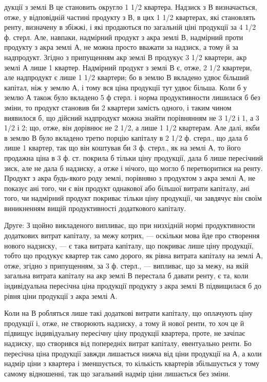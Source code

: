 дукції з землі В це становить округло 1 1/2 квартера. Надзиск з В визначається,
отже, у відповідній частині продукту з В, в цих 1 1/2 квартерах, які
становлять ренту, визначену в збіжжі, і які продаються по загальній ціні продукції
за 4  1/2 ф. стерл. Але, навпаки, надмірний продукт з акра землі В, надмірний
проти продукту з акра землі А, не можна просто вважати за надзиск,
а тому й за надпродукт. Згідно з припущенням акр землі В продукує 3  1/2 квартери,
акр землі А лише 1 квартер. Надмірний продукт з землі В є, отже,
2 1/2 квартери, але надпродукт є лише 1 1/2 квартери; бо в землю В вкладено
удвоє більший капітал, ніж у землю А, і тому вся ціна продукції тут удвоє
більша. Коли б у землю А також було вкладено 5 ф стерл. і норма продуктивности
лишилася б без зміни, то продукт становив би 2 квартери замість одного,
і таким чином виявилося б, що дійсний надпродукт можна знайти порівнянням
не 3  1/2 і 1, а 3  1/2 і 2; що, отже, він дорівнює не 2  1/2, а лише 1  1/2 квартерам.
Але далі, якби в землю В було вкладено третю порцію капіталу в 2  1/2 ф. стерл.,
що дала б лише 1 квартер, так що він коштував би 3 ф. стерл., як на землі А, то
його продажна ціна в 3 ф. ст. покрила б тільки ціну продукції, дала б лише
пересічний зиск, але не дала б надзиску, а отже і нічого, що могло б перетворитися
на ренту. Продукт з акра будь-якого роду землі, порівняно з продуктом
з акра землі А, не показує ані того, чи є він продукт однакової або більшої
витрати капіталу, ані того, чи надмірний продукт покриває тільки ціну продукції,
чи завдячує він своїм виникненням вищій продуктивності додаткового капіталу.

Друге: З щойно викладеного випливає, що при низхідній нормі продуктивности
додаткових витрат капіталу, за межу котрих, — оскільки мова йде
про створення нового надзиску, — є така витрата капіталу, що покриває лише
ціну продукції, тобто що продукує квартер так само дорого, як рівна витрата
капіталу на землі А, отже, згідно з припущенням, за 3 ф. стерл., — випливає,
що за межу, на якій загальна витрата капіталу на акр землі В перестала б
давати ренту, є та, коли індивідуальна пересічна ціна продукції продукту з
акра землі В підвищилася б до рівня ціни продукції з акра землі А.

Коли на В робляться лише такі додаткові витрати капіталу, що оплачують
ціну продукції і, отже, не створюють надзиску, а тому й нової ренти, то хоч
це й підвищує індивідуальну пересічну ціну продукції квартера, проте, не зачіпає
надзиску, що створився від попередніх витрат капіталу, евентуально ренти. Бо
пересічна ціна продукції завжди лишається нижча від ціни продукції на А, а коли
надмір ціни з квартера і зменшується, то кількість квартерів збільшується
у тому самому відношенні, так що загальний надмір ціни лишається без зміни.

